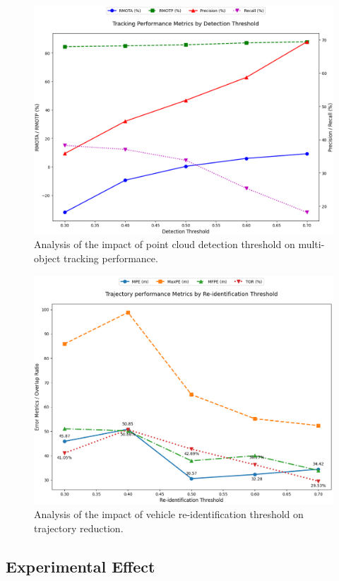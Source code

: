 \documentclass[lettersize,journal]{IEEEtran}
\begin{document}
\begin{figure}[t]
	\centering
	\includegraphics[width=\linewidth]{picture/picture6.png} 
	\caption{Analysis of the impact of point cloud detection threshold on multi-object tracking performance.} 
	\label{fig:6} 
\end{figure}

\begin{figure}[t]
	\centering
	\includegraphics[width=\linewidth]{picture/picture7.png} 
	\caption{Analysis of the impact of vehicle re-identification threshold on trajectory reduction.} 
	\label{fig:7} 
\end{figure}

\subsection{Experimental Effect}
\end{document}
